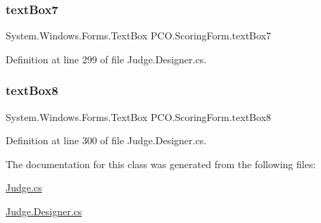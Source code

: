 \subsubsection{\texorpdfstring{text\+Box7}{textBox7}}
{\footnotesize\ttfamily System.\+Windows.\+Forms.\+Text\+Box P\+C\+O.\+Scoring\+Form.\+text\+Box7\hspace{0.3cm}{\ttfamily [private]}}



Definition at line 299 of file Judge.\+Designer.\+cs.

\mbox{\label{classPCO_1_1ScoringForm_a4da837774da99255a4ac562625dc3861}} 
\subsubsection{\texorpdfstring{text\+Box8}{textBox8}}
{\footnotesize\ttfamily System.\+Windows.\+Forms.\+Text\+Box P\+C\+O.\+Scoring\+Form.\+text\+Box8\hspace{0.3cm}{\ttfamily [private]}}



Definition at line 300 of file Judge.\+Designer.\+cs.



The documentation for this class was generated from the following files\+:\begin{DoxyCompactItemize}
\item 
\hyperlink{Judge_8cs}{Judge.\+cs}\item 
\hyperlink{Judge_8Designer_8cs}{Judge.\+Designer.\+cs}\end{DoxyCompactItemize}
